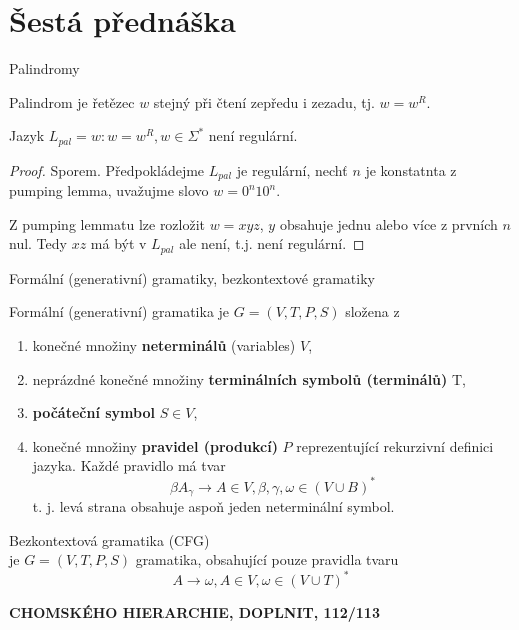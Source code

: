 \documentclass[../main.tex]{subfiles}
\begin{document}
\section{Šestá přednáška}

\begin{definition}
    Palindromy

    Palindrom je řetězec $w$ stejný při čtení zepředu i zezadu, tj. $w = w^R$.
\end{definition}
\begin{theorem}
    Jazyk $L_{pal} = {w : w=w^R, w\in \Sigma^* }$ není regulární.
    \begin{proof}
        Sporem. Předpokládejme $L_{pal}$ je regulární, nechť $n$ je konstatnta z pumping lemma,
        uvažujme slovo $w = 0^n10^n$.
        
        Z pumping lemmatu lze rozložit $w = xyz$, $y$ obsahuje jednu alebo více z prvních $n$ nul.
        Tedy $xz$ má být v $L_{pal}$ ale není, t.j. není regulární.
    \end{proof}
\end{theorem}

Formální (generativní) gramatiky, bezkontextové gramatiky
\begin{definition}
    Formální (generativní) gramatika je $G = (V,T,P,S)$ složena z
    \begin{enumerate}
        \item konečné množiny \textbf{neterminálů} (variables) $V$,
        \item neprázdné konečné množiny \textbf{terminálních symbolů (terminálů)} T,
        \item \textbf{počáteční symbol} $S \in V$,
        \item konečné množiny \textbf{pravidel (produkcí)} $P$ reprezentující rekurzivní definici jazyka. 
        Každé pravidlo má tvar
        \[\beta A_\gamma \rightarrow A \in V, \beta, \gamma, \omega \in (V \cup B)^*\]
        t. j. levá strana obsahuje aspoň jeden neterminální symbol.
    \end{enumerate}
\end{definition}

\begin{definition}
    Bezkontextová gramatika (CFG)\\

    je $G = (V,T,P,S)$ gramatika, obsahující pouze pravidla tvaru
    \[A \rightarrow \omega, A \in V, \omega \in (V\cup T)^*\]
\end{definition}
\begin{definition}
    \textbf{CHOMSKÉHO HIERARCHIE, DOPLNIT, 112/113}
\end{definition}
\end{document}
